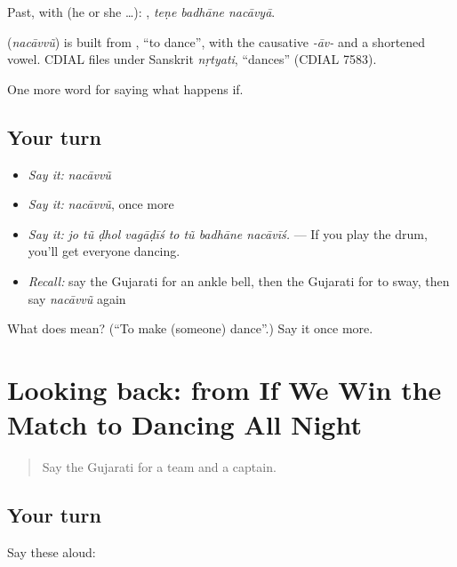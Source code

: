 Past, with  (he or she …):   , \emph{teṇe badhāne nacāvyā}.

\begin{cousinweb}
\textbf{} (\emph{nacāvvũ}) is built from \textbf{}, \textquotedblleft{}to dance\textquotedblright{}, with the causative \emph{-āv-} and a shortened vowel. CDIAL files \textbf{} under Sanskrit \emph{nṛtyati}, \textquotedblleft{}dances\textquotedblright{} (CDIAL 7583).
\end{cousinweb}

\begin{grammarlens}[title={What you've built}]
One more word for saying what happens if.
\end{grammarlens}

\subsection*{Your turn}
\begin{itemize}
\raggedright
  \item \emph{Say it:} \emph{nacāvvũ}
  \item \emph{Say it:} \emph{nacāvvũ}, once more
  \item \emph{Say it:} \emph{jo tũ ḍhol vagāḍīś to tũ badhāne nacāvīś.} — If you play the drum, you'll get everyone dancing.
  \item \emph{Recall:} say the Gujarati for an ankle bell, then the Gujarati for to sway, then say \emph{nacāvvũ} again
\end{itemize}

\begin{tcolorbox}[breakable,colback=teal!4,colframe=teal!35!black,title={Before you move on}]
What does  mean? (\textquotedblleft{}To make (someone) dance\textquotedblright{}.) Say it once more.
\end{tcolorbox}
\section[(dialogue)]{Looking back: from If We Win the Match to Dancing All Night}

\label{lesson:GU-R554-review-548-554}



\begin{quote}
Say the Gujarati for a team and a captain.
\end{quote}

\subsection*{Your turn}
Say these aloud:


